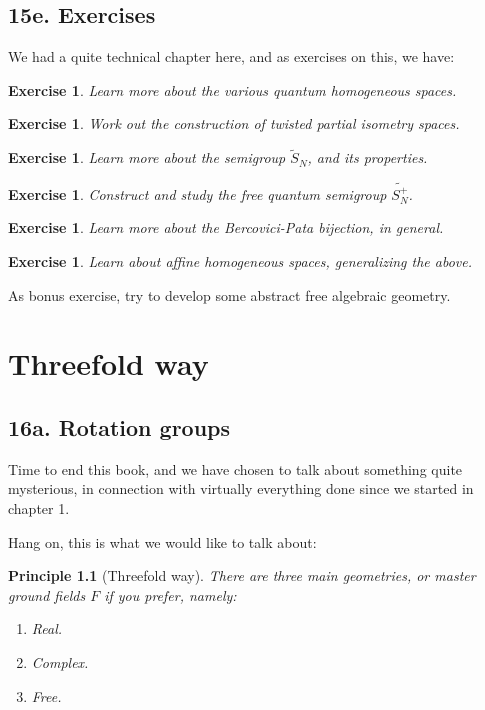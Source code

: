 \documentclass[12pt]{amsbook}
\newtheorem{exercise}[theorem]{Exercise}
\newtheorem{principle}[theorem]{Principle}
\begin{document}
\section*{15e. Exercises}

We had a quite technical chapter here, and as exercises on this, we have:

\begin{exercise}
Learn more about the various quantum homogeneous spaces.
\end{exercise}

\begin{exercise}
Work out the construction of twisted partial isometry spaces.
\end{exercise}

\begin{exercise}
Learn more about the semigroup $\widetilde{S}_N$, and its properties.
\end{exercise}

\begin{exercise}
Construct and study the free quantum semigroup $\widetilde{S_N^+}$.
\end{exercise}

\begin{exercise}
Learn more about the Bercovici-Pata bijection, in general.
\end{exercise}

\begin{exercise}
Learn about affine homogeneous spaces, generalizing the above.
\end{exercise}

As bonus exercise, try to develop some abstract free algebraic geometry.

\chapter{Threefold way}

\section*{16a. Rotation groups}

Time to end this book, and we have chosen to talk about something quite mysterious, in connection with virtually everything done since we started in chapter 1.

\bigskip

Hang on, this is what we would like to talk about:

\begin{principle}[Threefold way]
There are three main geometries, or master ground fields $F$ if you prefer, namely:
\begin{enumerate}
\item Real.

\item Complex.

\item Free.
\end{enumerate}
\end{principle}
\end{document}
